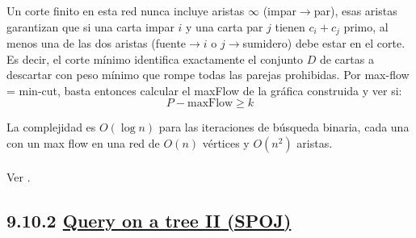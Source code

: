 Un corte finito en esta red nunca incluye aristas $\infty$ (impar$\to$par), esas aristas garantizan que si una carta impar $i$ y una carta par $j$ tienen $c_i+c_j$ primo, al menos
una de las dos aristas (fuente$\to i$ o $j\to$sumidero) debe estar en el corte. Es decir, el corte mínimo identifica exactamente el conjunto $D$ de cartas a descartar con peso mínimo que rompe todas las parejas prohibidas. Por max-flow = min-cut, basta entonces calcular el maxFlow de la gráfica construida y ver si:
\[
P - \text{maxFlow} \geq k
\]
 
La complejidad es $O(\log n)$ para las iteraciones de búsqueda binaria, cada una con un max flow en una red de $O(n)$ vértices y $O(n^2)$ aristas.
\\\\
Ver .

\subsection*{9.10.2 \href{https://www.spoj.com/problems/QTREE2/}{Query on a tree II (SPOJ)}}

